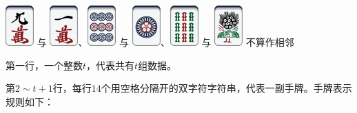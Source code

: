 \documentclass[
	lang=cn,
	color=green
]{elegantbook}
\begin{document}
{\begin{remark}
\begin{itemize}
			      \includegraphics[scale=0.5]{images/mahjong/9m.png} 与 \includegraphics[scale=0.5]{images/mahjong/1m.png}、\includegraphics[scale=0.5]{images/mahjong/9p.png} 与 \includegraphics[scale=0.5]{images/mahjong/1p.png}、\includegraphics[scale=0.5]{images/mahjong/9s.png} 与 \includegraphics[scale=0.5]{images/mahjong/1s.png} 不算作相邻
		\end{itemize}

	\end{remark}


}{
	第一行，一个整数$t$，代表共有$t$组数据。

	第$2 \sim t+1$行，每行$14$个用空格分隔开的双字符字符串，代表一副手牌。手牌表示规则如下：

}
\end{document}
